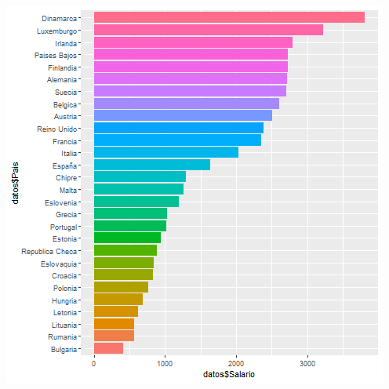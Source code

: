 \documentclass [a4paper] {article}
\begin{document}
\includegraphics[width=\textwidth]{diagrama2}
\end{document}
